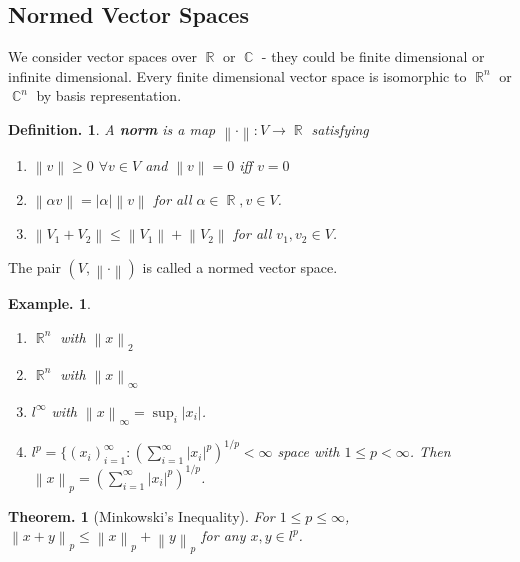 \documentclass[11pt, a4paper]{memoir}
\DeclareMathOperator{\R}{{\mathbb{R}}}
\DeclareMathOperator{\C}{{\mathbb{C}}}
\newcommand{\norm}[1]{\ensuremath{\left\lVert#1\right\rVert}}
\theoremstyle{change}
\newtheorem{theorem}{Theorem.}[section]
\theoremstyle{plain}
\theoremstyle{nonumberplain}
\newtheorem{definition}{Definition.}
\newtheorem{example}{Example.}
\numberwithin{equation}{section}
\begin{document}
\subsection{Normed Vector Spaces}
We consider vector spaces over $\R$ or $\C$ - they could be finite dimensional or infinite dimensional. Every finite dimensional
vector space is isomorphic to $\R^n$ or $\C^n$ by basis representation.
\begin{definition}
    A \textbf{norm} is a map $\norm{\cdot}:V\to\R$ satisfying
    \begin{enumerate}
        \item $\norm{v}\geq 0$ $\forall v\in V$ and $\norm{v}=0$ iff $v=0$
        \item $\norm{\alpha v}=|\alpha|\norm{v}$ for all $\alpha\in\R, v\in V$.
        \item $\norm{V_1+V_2}\leq\norm{V_1}+\norm{V_2}$ for all $v_1,v_2\in V$.
    \end{enumerate}
\end{definition}
The pair $(V,\norm{\cdot})$ is called a normed vector space.
\begin{example}
    \begin{enumerate}
        \item $\R^n$ with $\norm{x}_2$
        \item $\R^n$ with $\norm{x}_\infty$
        \item $l^\infty$ with $\norm{x}_\infty=\sup_i|x_i|$.
        \item $l^p=\{(x_i)_{i=1}^\infty:\left( \sum\limits_{i=1}^\infty |x_i|^p \right)^{1/p}<\infty$ space with $1\leq p<\infty$.
            Then $\norm{x}_p=\left(\sum\limits_{i=1}^\infty |x_i|^p\right)^{1/p}$.
    \end{enumerate}
\end{example}
\begin{theorem}[Minkowski's Inequality]
    For $1\leq p\leq\infty$, $\norm{x+y}_p\leq\norm{x}_p+\norm{y}_p$ for any $x,y\in l^p$.
\end{theorem}
\end{document}
